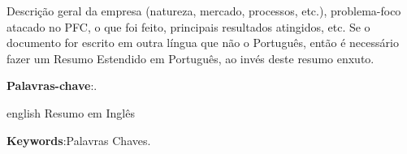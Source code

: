 

\setlength{\absparsep}{18pt} %
\begin{resumo}
Descrição geral da empresa (natureza, mercado, processos, etc.), problema-foco atacado no PFC, o que foi feito, principais resultados atingidos, etc.
Se o documento for escrito em outra língua que não o Português, então é necessário fazer um Resumo Estendido em Português, ao invés deste resumo enxuto.


 \textbf{Palavras-chave}:.
\end{resumo}


\begin{resumo}[Abstract]
 \begin{otherlanguage*}{english}
Resumo em Inglês
   \vspace{\onelineskip}
 
   \noindent 
   \textbf{Keywords}:Palavras Chaves.
 \end{otherlanguage*}
\end{resumo}
